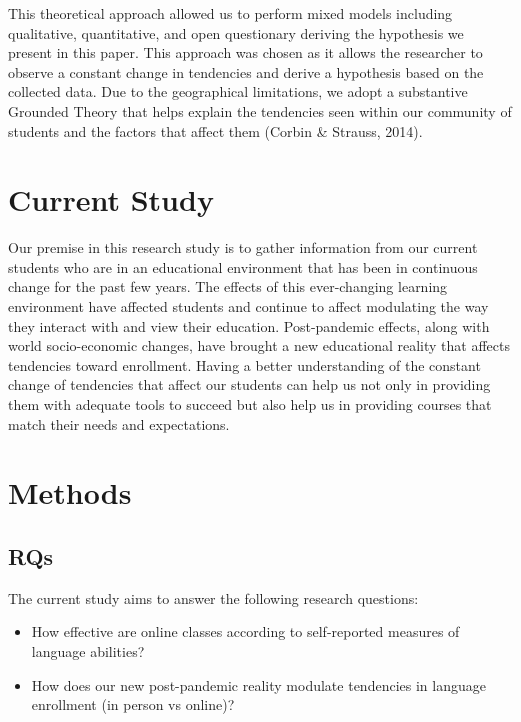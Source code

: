 \documentclass[
  man]{apa6}
\begin{document}
This theoretical approach allowed us to perform mixed models including qualitative, quantitative, and open questionary deriving the hypothesis we present in this paper. This approach was chosen as it allows the researcher to observe a constant change in tendencies and derive a hypothesis based on the collected data. Due to the geographical limitations, we adopt a substantive Grounded Theory that helps explain the tendencies seen within our community of students and the factors that affect them (Corbin \& Strauss, 2014).

\hypertarget{current-study}{%
\section{Current Study}\label{current-study}}

Our premise in this research study is to gather information from our current students who are in an educational environment that has been in continuous change for the past few years.
The effects of this ever-changing learning environment have affected students and continue to affect modulating the way they interact with and view their education. Post-pandemic effects, along with world socio-economic changes, have brought a new educational reality that affects tendencies toward enrollment.
Having a better understanding of the constant change of tendencies that affect our students can help us not only in providing them with adequate tools to succeed but also help us in providing courses that match their needs and expectations.

\hypertarget{methods}{%
\section{Methods}\label{methods}}

\hypertarget{rqs}{%
\subsection{RQs}\label{rqs}}

The current study aims to answer the following research questions:

\begin{itemize}
\item
  How effective are online classes according to self-reported measures of language abilities?
\item
  How does our new post-pandemic reality modulate tendencies in language enrollment (in person vs online)?
\end{itemize}
\end{document}
